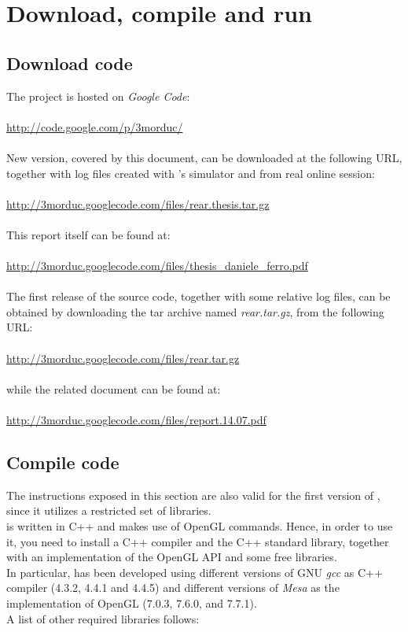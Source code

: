 \section{Download, compile and run \framework{}}
\label{sourcecode:downloadrun}

\subsection{Download code}
\label{sourcecode:downloadrun:download}

The \framework{} project is hosted on \textit{Google Code}:
\\
\\
\url{http://code.google.com/p/3morduc/}
\\
\\
New \framework{} version, covered by this document,
can be downloaded at the following URL, together with
log files created with \morduc{}'s simulator and from
real \morduc{} online session:
\\
\\
\url{http://3morduc.googlecode.com/files/rear.thesis.tar.gz}
\\
\\
This report itself can be found at:
\\
\\
\url{http://3morduc.googlecode.com/files/thesis_daniele_ferro.pdf}
\\
\\
The first release of the source code, together with
some relative log files, can be obtained by downloading
the tar archive named \textit{rear.tar.gz}, from the
following URL:
\\
\\
\url{http://3morduc.googlecode.com/files/rear.tar.gz}
\\
\\
while the related document can be found at:
\\
\\
\url{http://3morduc.googlecode.com/files/report.14.07.pdf}

\subsection{Compile code}
\label{sourcecode:downloadrun:compile}

The instructions exposed in this section are also valid for the
first version of \framework{}, since it utilizes a restricted
set of libraries.
\\
\framework{} is written in C++ and makes use of OpenGL commands.
Hence, in order to use it, you need to install a C++ compiler and the
C++ standard library, together with an implementation of the OpenGL
API and some free libraries.
\\
In particular, \framework{} has been developed using different versions
of GNU \textit{gcc} as
C++ compiler (4.3.2, 4.4.1 and 4.4.5) and different versions of 
\textit{Mesa} as the
implementation
of OpenGL (7.0.3, 7.6.0, and 7.7.1).
\\
A list of other required libraries follows:

